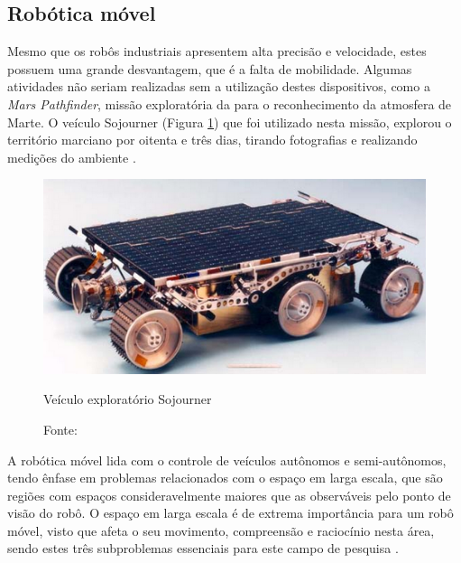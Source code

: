 \vspace{1cm}
\subsection{Robótica móvel}	


Mesmo que os robôs industriais apresentem alta precisão e velocidade, estes possuem uma grande desvantagem, que é a falta 
de mobilidade. 
Algumas atividades não seriam realizadas sem a utilização destes dispositivos, como a 
\textit{Mars Pathfinder}, missão exploratória da 
 para o reconhecimento da atmosfera de Marte. O 
veículo Sojourner (Figura \ref{fig:nasa}) que foi utilizado nesta missão, explorou o território marciano por oitenta e três dias, 
tirando fotografias e realizando 
medições do ambiente \cite{nasa}.

\begin{figure}[th]
 \centering
 \captionsetup{width=0.5\textwidth,font=footnotesize,textfont=bf}
 \includegraphics[scale=0.4]{figuras/nasa.png}
 \caption{Veículo exploratório Sojourner \label{fig:nasa}}
 \vspace{-0.3cm}
 \caption*{Fonte: \cite{nasarover}}
\end{figure}


A robótica móvel lida com o controle de veículos autônomos e semi-autônomos, tendo ênfase em problemas relacionados com o 
espaço em larga escala, que são regiões com espaços consideravelmente maiores que as observáveis pelo ponto de visão 
do robô. O espaço em larga escala é de extrema importância para um robô móvel, visto que afeta 
o seu movimento, compreensão e raciocínio nesta área, sendo estes três subproblemas essenciais para este campo de pesquisa
\cite{dudek_mobile}.


